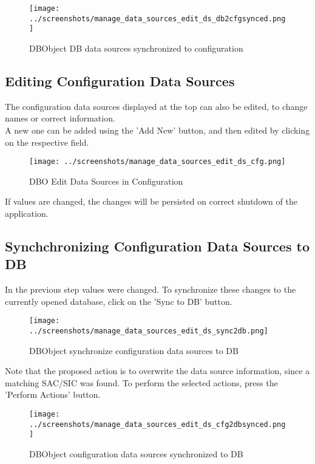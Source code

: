 \begin{figure}[H]
  \center
    \texttt{[image: ../screenshots/manage\_data\_sources\_edit\_ds\_db2cfgsynced.png]}
  \caption{DBObject DB data sources synchronized to configuration }
\end{figure}

\subsection{Editing Configuration Data Sources}

The configuration data sources displayed at the top can also be edited, to change names or correct information. \\

A new one can be added using the 'Add New' button, and then edited by clicking on the respective field. \\

\begin{figure}[H]
  \center
    \texttt{[image: ../screenshots/manage\_data\_sources\_edit\_ds\_cfg.png]}
  \caption{DBO Edit Data Sources in Configuration}
\end{figure}

If values are changed, the changes will be persisted on correct shutdown of the application.

\subsection{Synchchronizing Configuration Data Sources to DB}

In the previous step values were changed. To synchronize these changes to the currently opened database, click on the 'Sync to DB' button.

\begin{figure}[H]
  \center
    \texttt{[image: ../screenshots/manage\_data\_sources\_edit\_ds\_sync2db.png]}
  \caption{DBObject synchronize configuration data sources to DB}
\end{figure}

Note that the proposed action is to overwrite the data source information, since a matching SAC/SIC was found. To perform the selected actions, press the 'Perform Actions' button.

\begin{figure}[H]
  \center
    \texttt{[image: ../screenshots/manage\_data\_sources\_edit\_ds\_cfg2dbsynced.png]}
  \caption{DBObject configuration data sources synchronized to DB}
\end{figure}


